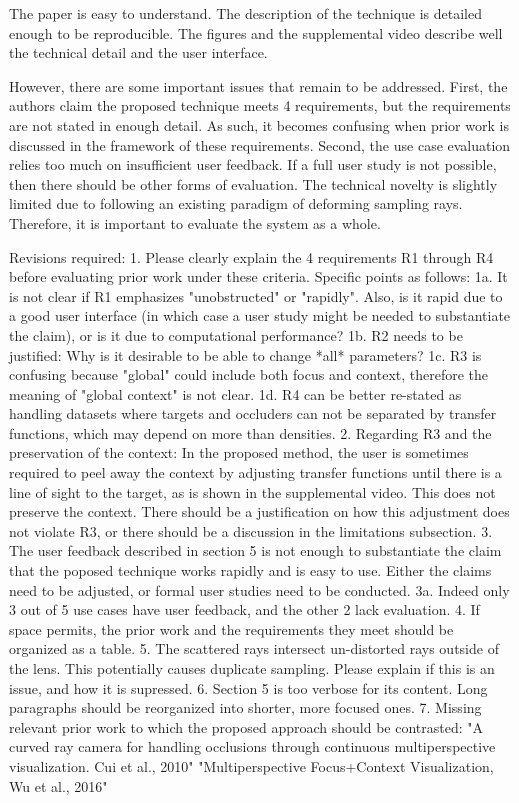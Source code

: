 \documentclass[a4paper,10pt]{article}
\begin{document}
    The paper is easy to understand. The description of the technique is detailed
    enough to be reproducible. The figures and the supplemental video describe well
    the technical detail and the user interface.

    However, there are some important issues that remain to be addressed. First, the
    authors claim the proposed technique meets 4 requirements, but the requirements
    are not stated in enough detail. As such, it becomes confusing when prior work is
    discussed in the framework of these requirements. Second, the use case evaluation
    relies too much on insufficient user feedback. If a full user study is not
    possible, then there should be other forms of evaluation. The technical novelty is
    slightly limited due to following an existing paradigm of deforming sampling rays.
    Therefore, it is important to evaluate the system as a whole.

    Revisions required:
    1. Please clearly explain the 4 requirements R1 through R4 before evaluating prior
    work under these criteria. Specific points as follows:
    1a. It is not clear if R1 emphasizes "unobstructed" or "rapidly". Also, is it
    rapid due to a good user interface (in which case a user study might be needed to
    substantiate the claim), or is it due to computational performance?
    1b. R2 needs to be justified: Why is it desirable to be able to change *all*
    parameters?
    1c. R3 is confusing because "global" could include both focus and context,
    therefore the meaning of "global context" is not clear.
    1d. R4 can be better re-stated as handling datasets where targets and occluders
    can not be separated by transfer functions, which may depend on more than
    densities.
    2. Regarding R3 and the preservation of the context: In the proposed method, the
    user is sometimes required to peel away the context by adjusting transfer
    functions until there is a line of sight to the target, as is shown in the
    supplemental video. This does not preserve the context. There should be a
    justification on how this adjustment does not violate R3, or there should be a
    discussion in the limitations subsection.
    3. The user feedback described in section 5 is not enough to substantiate the
    claim that the poposed technique works rapidly and is easy to use. Either the
    claims need to be adjusted, or formal user studies need to be conducted.
    3a. Indeed only 3 out of 5 use cases have user feedback, and the other 2 lack
    evaluation.
    4. If space permits, the prior work and the requirements they meet should be
    organized as a table.
    5. The scattered rays intersect un-distorted rays outside of the lens. This
    potentially causes duplicate sampling. Please explain if this is an issue, and how
    it is supressed.
    6. Section 5 is too verbose for its content. Long paragraphs should be reorganized
    into shorter, more focused ones.
    7. Missing relevant prior work to which the proposed approach should be
    contrasted:
    "A curved ray camera for handling occlusions through continuous multiperspective
    visualization. Cui et al., 2010"
    "Multiperspective Focus+Context Visualization, Wu et al., 2016"
    
\end{document}

